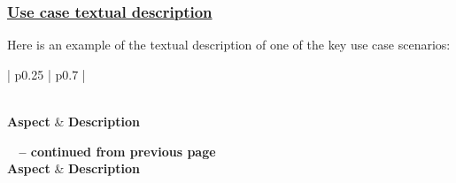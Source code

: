 \subsubsection{\underline{Use case textual description}}
Here is an example of the textual description of one of the key use case scenarios:

\renewcommand{\arraystretch}{1.5}%
\begin{longtable}{| p{} | p{} |}
    \caption{Generate AI Trip Itinerary use case textual description}                                                                                                                                                 \\
    \hline
    \textbf{Aspect}           & \textbf{Description}                                                                                                                                                                  \\
    \hline
    \endfirsthead

    {{\bfseries \tablename\ \thetable{} -- continued from previous page}}                                                                                                                                             \\
    \hline
    \textbf{Aspect}           & \textbf{Description}                                                                                                                                                                  \\
    \hline
    \endhead

    \hline {}                                                                                                                                                             \\
    \endfoot

    \hline
    \endlastfoot


\end{longtable}
